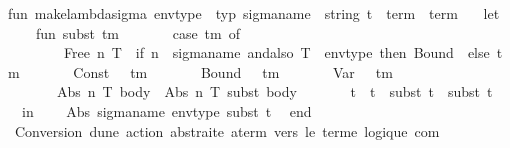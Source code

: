 \begin{isabellebody}
{\isacharasterisk}{\kern0pt}{\isacharparenright}{\kern0pt}\isanewline
fun\ make{\isacharunderscore}{\kern0pt}lambda{\isacharunderscore}{\kern0pt}sigma\ {\isacharparenleft}{\kern0pt}env{\isacharunderscore}{\kern0pt}type\ {\isacharcolon}{\kern0pt}\ typ{\isacharparenright}{\kern0pt}\ {\isacharparenleft}{\kern0pt}sigma{\isacharunderscore}{\kern0pt}name\ {\isacharcolon}{\kern0pt}\ string{\isacharparenright}{\kern0pt}\ {\isacharparenleft}{\kern0pt}t\ {\isacharcolon}{\kern0pt}\ term{\isacharparenright}{\kern0pt}\ {\isacharcolon}{\kern0pt}\ term\ {\isacharequal}{\kern0pt}\isanewline
\ \ let\isanewline
\ \ \ \ fun\ subst\ tm\ {\isacharequal}{\kern0pt}\isanewline
\ \ \ \ \ \ case\ tm\ of\isanewline
\ \ \ \ \ \ \ \ Free\ {\isacharparenleft}{\kern0pt}n{\isacharcomma}{\kern0pt}\ T{\isacharparenright}{\kern0pt}\ {\isacharequal}{\kern0pt}{\isachargreater}{\kern0pt}\ if\ n\ {\isacharequal}{\kern0pt}\ sigma{\isacharunderscore}{\kern0pt}name\ andalso\ T\ {\isacharequal}{\kern0pt}\ env{\isacharunderscore}{\kern0pt}type\ then\ Bound\ {}\ else\ tm\isanewline
\ \ \ \ \ \ {\isacharbar}{\kern0pt}\ Const\ {\isacharunderscore}{\kern0pt}\ {\isacharequal}{\kern0pt}{\isachargreater}{\kern0pt}\ tm\isanewline
\ \ \ \ \ \ {\isacharbar}{\kern0pt}\ Bound\ {\isacharunderscore}{\kern0pt}\ {\isacharequal}{\kern0pt}{\isachargreater}{\kern0pt}\ tm\isanewline
\ \ \ \ \ \ {\isacharbar}{\kern0pt}\ Var\ {\isacharunderscore}{\kern0pt}\ {\isacharequal}{\kern0pt}{\isachargreater}{\kern0pt}\ tm\isanewline
\ \ \ \ \ \ {\isacharbar}{\kern0pt}\ Abs\ {\isacharparenleft}{\kern0pt}n{\isacharcomma}{\kern0pt}\ T{\isacharcomma}{\kern0pt}\ body{\isacharparenright}{\kern0pt}\ {\isacharequal}{\kern0pt}{\isachargreater}{\kern0pt}\ Abs\ {\isacharparenleft}{\kern0pt}n{\isacharcomma}{\kern0pt}\ T{\isacharcomma}{\kern0pt}\ subst\ body{\isacharparenright}{\kern0pt}\isanewline
\ \ \ \ \ \ {\isacharbar}{\kern0pt}\ t{}\ {\isachardollar}{\kern0pt}\ t{}\ {\isacharequal}{\kern0pt}{\isachargreater}{\kern0pt}\ subst\ t{}\ {\isachardollar}{\kern0pt}\ subst\ t{}\isanewline
\ \ in\isanewline
\ \ \ \ Abs\ {\isacharparenleft}{\kern0pt}sigma{\isacharunderscore}{\kern0pt}name{\isacharcomma}{\kern0pt}\ env{\isacharunderscore}{\kern0pt}type{\isacharcomma}{\kern0pt}\ subst\ t{\isacharparenright}{\kern0pt}\isanewline
\ \ end\isanewline
{\isacharparenleft}{\kern0pt}{\isacharasterisk}{\kern0pt}\ Conversion\ d{\isacharprime}{\kern0pt}une\ action\ abstraite\ {\isacharparenleft}{\kern0pt}a{\isacharunderscore}{\kern0pt}term{\isacharparenright}{\kern0pt}\ vers\ le\ terme\ logique\ com\ {\isacharasterisk}{\kern0pt}{\isacharparenright}{\kern0pt}\isanewline

\end{isabellebody}
